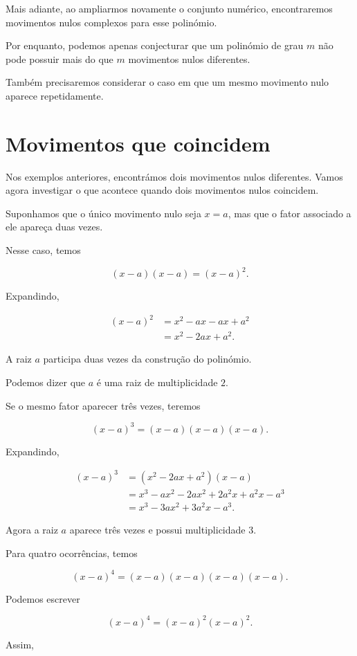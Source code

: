 \documentclass[12pt,a4paper]{article}
\begin{document}
Mais adiante, ao ampliarmos novamente o conjunto numérico, encontraremos
movimentos nulos complexos para esse polinómio.

Por enquanto, podemos apenas conjecturar que um polinómio de grau \(m\)
não pode possuir mais do que \(m\) movimentos nulos diferentes.

Também precisaremos considerar o caso em que um mesmo movimento nulo
aparece repetidamente.

\section{Movimentos que coincidem}

Nos exemplos anteriores, encontrámos dois movimentos nulos diferentes.
Vamos agora investigar o que acontece quando dois movimentos nulos
coincidem.

Suponhamos que o único movimento nulo seja \(x=a\), mas que o fator
associado a ele apareça duas vezes.

Nesse caso, temos

\[
(x-a)(x-a)=(x-a)^2.
\]

Expandindo,

\[
\begin{aligned}
(x-a)^2
&=x^2-ax-ax+a^2\\
&=x^2-2ax+a^2.
\end{aligned}
\]

A raiz \(a\) participa duas vezes da construção do polinómio.

Podemos dizer que \(a\) é uma raiz de multiplicidade \(2\).

Se o mesmo fator aparecer três vezes, teremos

\[
(x-a)^3=(x-a)(x-a)(x-a).
\]

Expandindo,

\[
\begin{aligned}
(x-a)^3
&=(x^2-2ax+a^2)(x-a)\\
&=x^3-ax^2-2ax^2+2a^2x+a^2x-a^3\\
&=x^3-3ax^2+3a^2x-a^3.
\end{aligned}
\]

Agora a raiz \(a\) aparece três vezes e possui multiplicidade \(3\).

Para quatro ocorrências, temos

\[
(x-a)^4=(x-a)(x-a)(x-a)(x-a).
\]

Podemos escrever

\[
(x-a)^4=(x-a)^2(x-a)^2.
\]

Assim,
\end{document}
